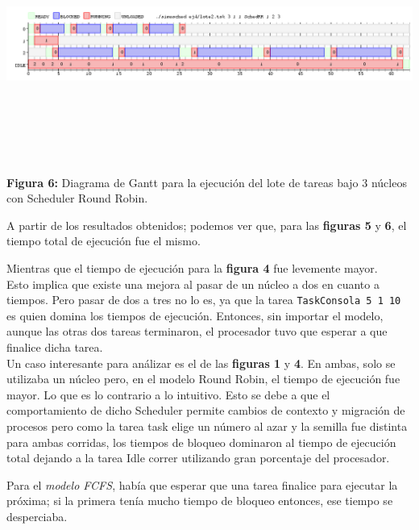 \documentclass[a4paper]{article}
\begin{document}
  \includegraphics[width=\textwidth,height=3.0in,keepaspectratio]{imagenes/ej4/3core.png} \newline
\begin {flushleft}
\textbf{Figura 6:} Diagrama de Gantt para la ejecuci\'on del lote de tareas bajo 3 n\'ucleos con Scheduler Round Robin.
\end{flushleft}
 
\bigskip 
 
 A partir de los resultados obtenidos; podemos ver que, para las \textbf{figuras 5} y \textbf{6}, el tiempo total de ejecución fue el mismo. 
 
 Mientras que el tiempo de ejecuci\'on para la\textbf{ figura 4} fue levemente mayor.\\
 
 Esto implica que existe una mejora al pasar de un n\'ucleo a dos en cuanto a tiempos. Pero pasar de dos a tres no lo es, ya que la tarea \texttt{TaskConsola 5 1 10} es quien domina los tiempos de ejecuci\'on. Entonces, sin importar el modelo, aunque las otras dos tareas terminaron, el procesador tuvo que esperar a que finalice dicha tarea.\\
 
 Un caso interesante para análizar es el de las \textbf{figuras 1} y \textbf{4}. En ambas, solo se utilizaba un núcleo pero, en el modelo Round Robin, el tiempo de ejecución fue mayor. Lo que es lo contrario a lo intuitivo. Esto se debe a que el comportamiento de dicho Scheduler permite cambios de contexto y migración de procesos pero como la tarea task elige un n\'umero al azar y la semilla fue distinta para ambas corridas, los tiempos de bloqueo dominaron al tiempo de ejecuci\'on total dejando a la tarea Idle correr utilizando gran porcentaje del procesador.
 
 Para el \emph{modelo FCFS}, había que esperar que una tarea finalice para ejecutar la próxima; si la primera tenía mucho tiempo de bloqueo entonces, ese tiempo se desperciaba. 
 
\end{document}

